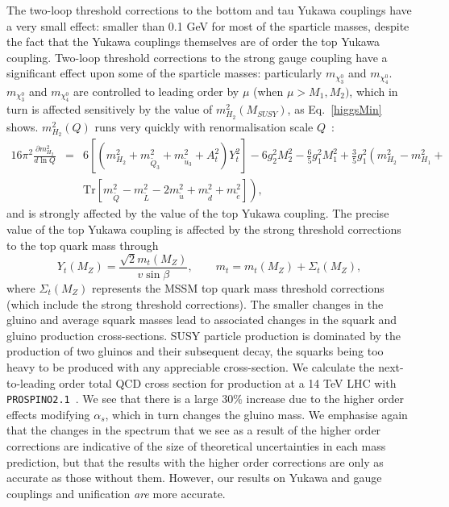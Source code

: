 \documentclass[final,3p,times,pdflatex]{elsarticle}
\begin{document}
The two-loop threshold corrections to the bottom and tau Yukawa couplings 
have a very small effect: smaller than 0.1 GeV for most of the sparticle
masses, despite the fact that the Yukawa couplings themselves are of order the
top Yukawa coupling. 
Two-loop threshold corrections to the strong gauge coupling have a significant
effect upon some of the sparticle masses: particularly $m_{\chi_3^0}$ and
$m_{\chi_4^0}$. 
$m_{\chi_3^0}$ and
$m_{\chi_4^0}$ are controlled to leading order by $\mu$ (when $\mu>M_1, M_2)$,
which in turn is affected sensitively by the value of $m_{H_2}^2(M_{SUSY})$,
as Eq.~\ref{higgsMin} shows. $m_{H_2}^2(Q)$ runs very quickly with
renormalisation scale $Q$~\cite{Martin:1993zk}:
 \begin{eqnarray}
16 \pi^2\frac{\partial m_{H_2}^2}{d \ln Q} &=& 
6 \left[ (m_{H_2}^2 + m_{{\tilde Q}_3}^2 +
  m_{{\tilde u}_3}^2 + A_t^2)  Y_t^2  \right] - 6 g_2^2 M_2^2 - \frac{6}{5}
g_1^2 M_1^2 + \frac{3}{5}
g_1^2 \left(m_{H_2}^2-m_{H_1}^2 + \right. \nonumber \\
&&\left. \mbox{Tr}[m_{\tilde Q}^2 - m_{\tilde L}^2 - 2 
m_{\tilde u}^2 + m_{\tilde d}^2 + m_{\tilde e}^2] \right), \label{rgesA}
\end{eqnarray}
and is strongly affected by the value of the 
top Yukawa coupling.
The precise value of the top Yukawa coupling is affected by the strong
threshold corrections to the top quark mass
through~\cite{Pierce:1996zz}
\begin{equation}
Y_t(M_Z) = \frac{\sqrt{2} m_t(M_Z)}{v \sin \beta}, \qquad 
m_t = m_t(M_Z) + \Sigma_t(M_Z),
\end{equation}
where $\Sigma_t(M_Z)$ represents the MSSM top quark mass threshold corrections
(which include the strong threshold corrections).
The smaller changes in the gluino and average squark masses lead to associated
changes in the squark and gluino production cross-sections. 
SUSY particle production is dominated by the production of two gluinos and
their subsequent decay, the squarks being too heavy to be produced with any
appreciable cross-section. We calculate the next-to-leading order total QCD
cross section for production at a 14 TeV LHC with {\tt
  PROSPINO2.1}~\cite{Beenakker:1996ed,Beenakker:1996ch}. We see that there is
a large 30$\%$ increase due to the higher order effects modifying $\alpha_s$,
which in turn changes the gluino mass. We emphasise again that the changes in
the 
spectrum that we see as a result of the higher order corrections are
indicative of the size of theoretical uncertainties in 
each mass prediction, but that the results with the higher order corrections
are only as accurate as those without them. 
However, our results on Yukawa and gauge couplings and unification {\em are}
more accurate. 
\end{document}
